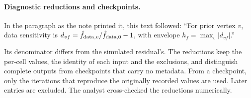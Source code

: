 \paragraph{Diagnostic reductions and checkpoints.} In the paragraph as the note printed it, this text followed: ``For prior vertex $v$, data sensitivity is $d_{vf}=\hat f_{{\rm data},v}/\hat f_{{\rm data},0}-1$, with envelope $h_f=\max_v|d_{vf}|$.''\par Its denominator differs from the simulated residual's. The reductions keep the per-cell values, the identity of each input and the exclusions, and distinguish complete outputs from checkpoints that carry no metadata. From a checkpoint, only the iterations that reproduce the originally recorded values are used. Later entries are excluded. The analyst cross-checked the reductions numerically.

